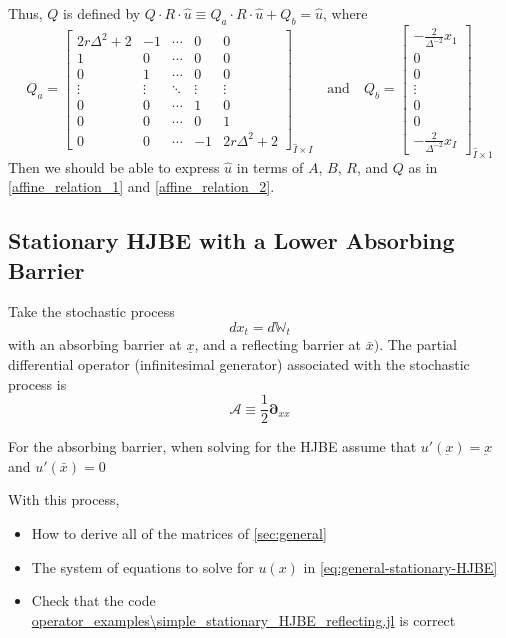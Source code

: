 \documentclass[11pt]{article}
\newcommand{\D}[1][]{\ensuremath{\boldsymbol{\partial}_{#1}}}
\newcommand{\W}{\ensuremath{\mathbb{W}}}
\newcommand{\A}{\ensuremath{\mathcal{A}}}
\begin{document}
Thus, $Q$ is defined by $Q\cdot R\cdot\hat{u}\equiv Q_a\cdot R\cdot\hat{u}+Q_b = \hat{u}$, where
\begin{equation}
Q_a = \begin{bmatrix}
2r\Delta^2+2&-1&\cdots&0&0\\
1&0&\cdots&0&0\\
0&1&\cdots&0&0\\
\vdots&\vdots&\ddots&\vdots&\vdots\\
0&0&\cdots&1&0\\
0&0&\cdots&0&1\\
0&0&\cdots&-1&2r\Delta^2+2
\end{bmatrix}_{\hat{I}\times I}\quad\text{and}\quad Q_b = \begin{bmatrix}
-\frac{2}{\Delta^{-2}}x_1\\
0\\
0\\
\vdots\\
0\\
0\\
-\frac{2}{\Delta^{-2}}x_{I}
\end{bmatrix}_{\hat{I}\times 1}
\end{equation}
Then we should be able to express $\hat{u}$ in terms of $A$, $B$, $R$, and $Q$ as in \eqref{affine_relation_1} and \eqref{affine_relation_2}.

\subsection{Stationary HJBE with a Lower Absorbing Barrier}
Take the stochastic process
$$
d x_t = d \W_t
$$
with an absorbing barrier at $\underline{x}$, and a reflecting barrier at $\bar{x})$.  The partial differential operator (infinitesimal generator) associated with the stochastic process is
$$
\A \equiv \frac{1}{2}\D[xx]
$$

For the absorbing barrier, when solving for the HJBE assume that $u'(\underbar{x}) = \underbar{x}$ and $u'(\bar{x}) = 0$


With this process,
\begin{itemize}
	\item How to derive all of the matrices of \cref{sec:general}
	\item The system of equations to solve for $u(x)$ in \cref{eq:general-stationary-HJBE}
	\item Check that the code \url{operator_examples\simple_stationary_HJBE_reflecting.jl} is correct
\end{itemize}
\end{document}
